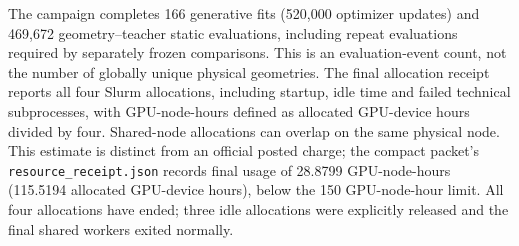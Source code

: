 The campaign completes 166 generative fits (520,000 optimizer updates) and
469,672 geometry--teacher static evaluations, including repeat evaluations
required by separately frozen comparisons. This is an evaluation-event count,
not the number of globally unique physical geometries. The final allocation
receipt reports all four Slurm allocations, including startup, idle time and
failed technical subprocesses, with GPU-node-hours defined as allocated
GPU-device hours divided by four. Shared-node allocations can overlap on the
same physical node. This estimate is distinct from an official posted charge;
the compact packet's \texttt{resource\_receipt.json} records final
usage of 28.8799 GPU-node-hours (115.5194 allocated
GPU-device hours), below the 150 GPU-node-hour limit. All four allocations
have ended; three idle allocations were explicitly released and the final
shared workers exited normally.
